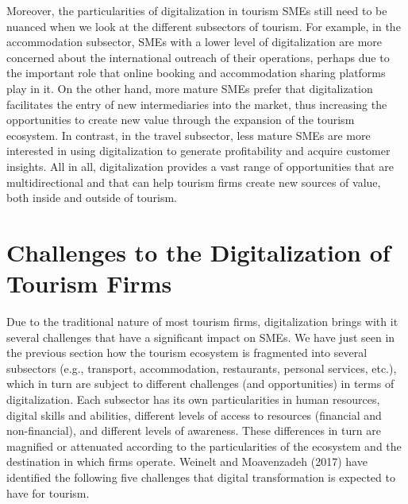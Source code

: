 \documentclass[
  letterpaper,
  DIV=11,
  numbers=noendperiod]{scrreprt}
\begin{document}
Moreover, the particularities of digitalization in tourism SMEs still
need to be nuanced when we look at the different subsectors of tourism.
For example, in the accommodation subsector, SMEs with a lower level of
digitalization are more concerned about the international outreach of
their operations, perhaps due to the important role that online booking
and accommodation sharing platforms play in it. On the other hand, more
mature SMEs prefer that digitalization facilitates the entry of new
intermediaries into the market, thus increasing the opportunities to
create new value through the expansion of the tourism ecosystem. In
contrast, in the travel subsector, less mature SMEs are more interested
in using digitalization to generate profitability and acquire customer
insights. All in all, digitalization provides a vast range of
opportunities that are multidirectional and that can help tourism firms
create new sources of value, both inside and outside of tourism.

\hypertarget{challenges-to-the-digitalization-of-tourism-firms}{%
\section{Challenges to the Digitalization of Tourism
Firms}\label{challenges-to-the-digitalization-of-tourism-firms}}

Due to the traditional nature of most tourism firms, digitalization
brings with it several challenges that have a significant impact on
SMEs. We have just seen in the previous section how the tourism
ecosystem is fragmented into several subsectors (e.g., transport,
accommodation, restaurants, personal services, etc.), which in turn are
subject to different challenges (and opportunities) in terms of
digitalization. Each subsector has its own particularities in human
resources, digital skills and abilities, different levels of access to
resources (financial and non-financial), and different levels of
awareness. These differences in turn are magnified or attenuated
according to the particularities of the ecosystem and the destination in
which firms operate. Weinelt and Moavenzadeh (2017) have identified the
following five challenges that digital transformation is expected to
have for tourism.
\end{document}
